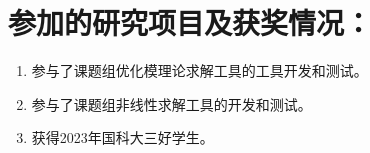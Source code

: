 \section*{参加的研究项目及获奖情况：}

\begin{enumerate}
    \item 参与了课题组优化模理论求解工具的工具开发和测试。
    \item 参与了课题组非线性求解工具的开发和测试。
    \item 获得2023年国科大三好学生。
\end{enumerate}

\cleardoublepage[plain]%
